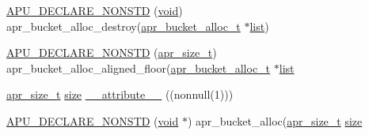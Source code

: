 \begin{DoxyCompactItemize}
\item 
\hyperlink{group__APR__Util__Bucket__Brigades_gaa36958c6bae91ffb67ea0bb3a932803c}{A\+P\+U\+\_\+\+D\+E\+C\+L\+A\+R\+E\+\_\+\+N\+O\+N\+S\+TD} (\hyperlink{group__MOD__ISAPI_gacd6cdbf73df3d9eed42fa493d9b621a6}{void}) apr\+\_\+bucket\+\_\+alloc\+\_\+destroy(\hyperlink{structapr__bucket__alloc__t}{apr\+\_\+bucket\+\_\+alloc\+\_\+t} $\ast$\hyperlink{pcregrep_8txt_aeb6b944e4524f915483b5696b7f2f424}{list})
\item 
\hyperlink{group__APR__Util__Bucket__Brigades_gac6ac7f751dc81b331e7e06a5cc0091f2}{A\+P\+U\+\_\+\+D\+E\+C\+L\+A\+R\+E\+\_\+\+N\+O\+N\+S\+TD} (\hyperlink{group__apr__platform_gaaa72b2253f6f3032cefea5712a27540e}{apr\+\_\+size\+\_\+t}) apr\+\_\+bucket\+\_\+alloc\+\_\+aligned\+\_\+floor(\hyperlink{structapr__bucket__alloc__t}{apr\+\_\+bucket\+\_\+alloc\+\_\+t} $\ast$\hyperlink{pcregrep_8txt_aeb6b944e4524f915483b5696b7f2f424}{list}
\item 
\hyperlink{group__apr__platform_gaaa72b2253f6f3032cefea5712a27540e}{apr\+\_\+size\+\_\+t} \hyperlink{README_8txt_a870076999eb1486aa63d2e2cf5cdfa55}{size} \hyperlink{group__APR__Util__Bucket__Brigades_gae0af316ed59541b70389da41aaeef4b6}{\+\_\+\+\_\+attribute\+\_\+\+\_\+} ((nonnull(1)))
\item 
\hyperlink{group__APR__Util__Bucket__Brigades_ga45c726656436cdba52fbc7e4cde2e89e}{A\+P\+U\+\_\+\+D\+E\+C\+L\+A\+R\+E\+\_\+\+N\+O\+N\+S\+TD} (\hyperlink{group__MOD__ISAPI_gacd6cdbf73df3d9eed42fa493d9b621a6}{void} $\ast$) apr\+\_\+bucket\+\_\+alloc(\hyperlink{group__apr__platform_gaaa72b2253f6f3032cefea5712a27540e}{apr\+\_\+size\+\_\+t} \hyperlink{README_8txt_a870076999eb1486aa63d2e2cf5cdfa55}{size}
\end{DoxyCompactItemize}
